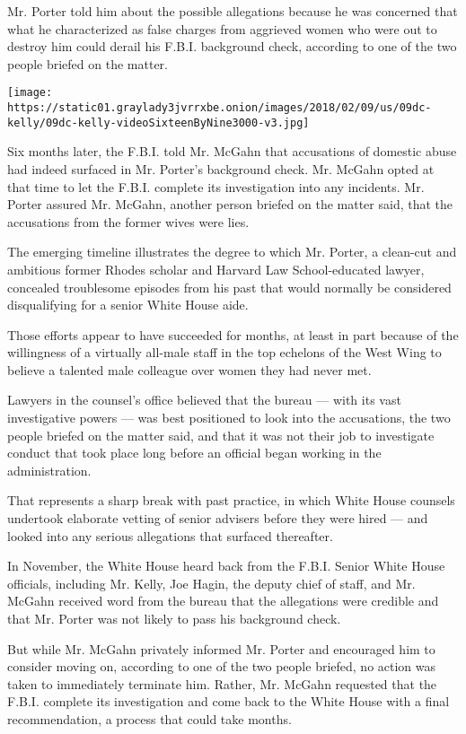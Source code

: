 Mr. Porter told him about the possible allegations because he was
concerned that what he characterized as false charges from aggrieved
women who were out to destroy him could derail his F.B.I. background
check, according to one of the two people briefed on the matter.

\texttt{[image: https://static01.graylady3jvrrxbe.onion/images/2018/02/09/us/09dc-kelly/09dc-kelly-videoSixteenByNine3000-v3.jpg]}

Six months later, the F.B.I. told Mr. McGahn that accusations of
domestic abuse had indeed surfaced in Mr. Porter's background check. Mr.
McGahn opted at that time to let the F.B.I. complete its investigation
into any incidents. Mr. Porter assured Mr. McGahn, another person
briefed on the matter said, that the accusations from the former wives
were lies.

The emerging timeline illustrates the degree to which Mr. Porter, a
clean-cut and ambitious former Rhodes scholar and Harvard Law
School-educated lawyer, concealed troublesome episodes from his past
that would normally be considered disqualifying for a senior White House
aide.

Those efforts appear to have succeeded for months, at least in part
because of the willingness of a virtually all-male staff in the top
echelons of the West Wing to believe a talented male colleague over
women they had never met.

Lawyers in the counsel's office believed that the bureau --- with its
vast investigative powers --- was best positioned to look into the
accusations, the two people briefed on the matter said, and that it was
not their job to investigate conduct that took place long before an
official began working in the administration.

That represents a sharp break with past practice, in which White House
counsels undertook elaborate vetting of senior advisers before they were
hired --- and looked into any serious allegations that surfaced
thereafter.

In November, the White House heard back from the F.B.I. Senior White
House officials, including Mr. Kelly, Joe Hagin, the deputy chief of
staff, and Mr. McGahn received word from the bureau that the allegations
were credible and that Mr. Porter was not likely to pass his background
check.

But while Mr. McGahn privately informed Mr. Porter and encouraged him to
consider moving on, according to one of the two people briefed, no
action was taken to immediately terminate him. Rather, Mr. McGahn
requested that the F.B.I. complete its investigation and come back to
the White House with a final recommendation, a process that could take
months.

